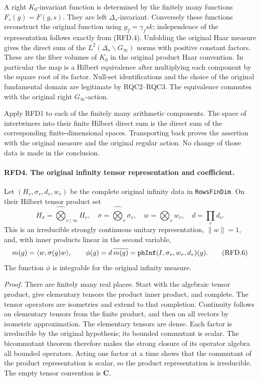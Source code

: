 \documentclass[11pt,a4paper]{article}
\numberwithin{equation}{section}
\theoremstyle{remark}\newtheorem{remark}[theorem]{Remark}
\begin{document}
A right \(K_0\)-invariant function is determined by the finitely
many functions \(F_s(g)=F(g,s)\).  They are left
\(\Delta_s\)-invariant.  Conversely these functions reconstruct
the original function using \(g_f=\gamma_fs k\); independence
of the representation follows exactly from (RFD.4).
Unfolding the original Haar measure gives the direct sum of the
\(L^2(\Delta_s\backslash G_\infty)\) norms with positive
constant factors.  These are the fiber volumes of \(K_0\) in
the original product Haar convention.  In particular the map is
a Hilbert equivalence after multiplying each component by the
square root of its factor.  Null-set identifications and the
choice of the original fundamental domain are legitimate by
RQC2--RQC3.  The equivalence commutes with the original right
\(G_\infty\)-action.

Apply RFD1 to each of the finitely many arithmetic components.
The space of intertwiners into their finite Hilbert direct sum
is the direct sum of the corresponding finite-dimensional spaces.
Transporting back proves the assertion with the original measure
and the original regular action.  No change of those data is
made in the conclusion.

\paragraph{RFD4. The original infinity tensor representation and coefficient.}
\label{claim:RFD4}
Let \((H_v,\sigma_v,d_v,w_v)\) be the complete original infinity
data in \texttt{Rows\allowbreak Fin\allowbreak Dim}.  On their Hilbert tensor product set
\[
 H_\sigma=\widehat\bigotimes_{v\mid\infty}H_v,
 \quad \sigma=\widehat\bigotimes_v\sigma_v,
 \quad w=\bigotimes_vw_v,
 \quad d=\prod_vd_v.
 \tag{RFD.5}
\]
This is an irreducible strongly continuous unitary representation,
\(\|w\|=1\), and, with inner products linear in the second variable,
\[
 m(g)=\langle w,\sigma(g)w\rangle,
 \qquad \phi(g)=d\,\overline{m(g)}
       =\texttt{ph\allowbreak Inf}(I,\sigma_v,w_v,d_v)(g).
 \tag{RFD.6}
\]
The function \(\phi\) is integrable for the original infinity measure.

\emph{Proof.}
There are finitely many real places.  Start with the algebraic
tensor product, give elementary tensors the product inner product,
and complete.  The tensor operators are isometries and extend to
that completion.  Continuity follows on elementary tensors from
the finite product, and then on all vectors by isometric
approximation.  The elementary tensors are dense.  Each factor
is irreducible by the original hypothesis; its bounded commutant
is scalar.  The bicommutant theorem therefore makes the strong
closure of its operator algebra all bounded operators.  Acting
one factor at a time shows that the commutant of the product
representation is scalar, so the product representation is
irreducible.  The empty tensor convention is \(\mathbf C\).
\end{document}
